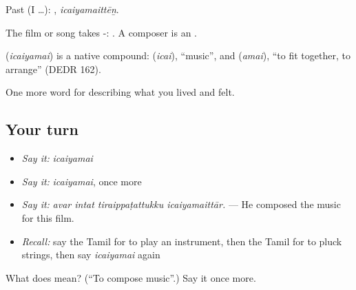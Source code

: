 Past (I …): , \emph{icaiyamaittēṉ}.

The film or song takes -:  . A composer is an .

\begin{cousinweb}
\textbf{} (\emph{icaiyamai}) is a native compound:  (\emph{icai}), \textquotedblleft{}music\textquotedblright{}, and  (\emph{amai}), \textquotedblleft{}to fit together, to arrange\textquotedblright{} (DEDR 162).
\end{cousinweb}

\begin{grammarlens}[title={What you've built}]
One more word for describing what you lived and felt.
\end{grammarlens}

\subsection*{Your turn}
\begin{itemize}
\raggedright
  \item \emph{Say it:} \emph{icaiyamai}
  \item \emph{Say it:} \emph{icaiyamai}, once more
  \item \emph{Say it:} \emph{avar intat tiraippaṭattukku icaiyamaittār.} — He composed the music for this film.
  \item \emph{Recall:} say the Tamil for to play an instrument, then the Tamil for to pluck strings, then say \emph{icaiyamai} again
\end{itemize}

\begin{tcolorbox}[breakable,colback=teal!4,colframe=teal!35!black,title={Before you move on}]
What does  mean? (\textquotedblleft{}To compose music\textquotedblright{}.) Say it once more.
\end{tcolorbox}
